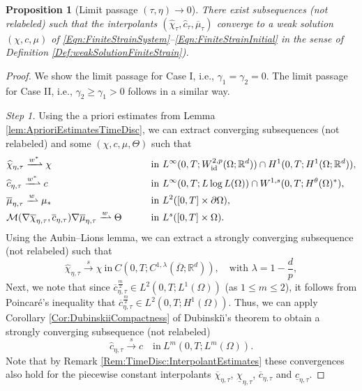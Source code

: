 \documentclass[a4paper,12pt]{article}
\newcommand{\R}{\mathbb{R}}
\newcommand{\calM}{\mathcal{M}}
\newcommand{\pl}{\partial}
\newcommand{\ubar}{\underline}
\newcommand{\id}{\mathrm{id}}
\newcommand{\chibar}{\overline{\chi}}
\newcommand{\chihat}{\widehat{\chi}}
\newcommand{\mubar}{\overline{\mu}}
\newcommand{\cbar}{\overline{c}}
\newcommand{\chat}{\widehat{c}}
\newcommand{\wto}{\xrightharpoonup{w}}
\newcommand{\wstarto}{\xrightharpoonup{w^*}}
\newcommand{\sto}{\xrightarrow{s}}
\theoremstyle{plain}
\newtheorem{Prop}[Th]{Proposition}
\theoremstyle{definition}
\numberwithin{equation}{section}
\begin{document}
 
	\begin{Prop}[Limit passage $(\tau,\eta)\to 0$]
         \label{Prop:LimitTimeDisc}
		There exist subsequences (not relabeled) such that the interpolants  $(\chihat_\tau, \chat_\tau, \mubar_\tau)$ converge to a weak solution $(\chi, c, \mu)$ of \eqref{Eqn:FiniteStrainSystem}--\eqref{Eqn:FiniteStrainInitial} in the sense of Definition \ref{Def:weakSolutionFiniteStrain}).
%
	\end{Prop}	


\begin{proof}
We show the limit passage for Case I, i.e., $\gamma_1=\gamma_2=0$. The limit passage for Case II, i.e., $\gamma_2\geq \gamma_1>0$ follows in a similar way.


\emph{Step 1.}
Using the a priori estimates from Lemma \ref{lem:AprioriEstimatesTimeDisc}, 
we can extract converging subsequences (not relabeled) and some $(\chi,c,\mu,\Theta)$ such that
\begin{alignat*}{2}
			&\chihat_{\eta,\tau} \wstarto \chi\ &&\text{in}\ L^\infty(0,T;W^{2,p}_\id(\Omega;\R^d))\cap H^1(0,T;H^1(\Omega;\R^d)),\\
			&\chat_{\eta,\tau} \wstarto c&&\text{in}\ L^\infty(0,T;L\log L(\Omega))\cap W^{1,s}(0,T;H^\theta(\Omega)^*),\\
			&\mubar_{\eta,\tau} \wto \mu_*&&\text{in}\ L^2([0,T]\times \pl\Omega),\\
            &\calM(\nabla\chibar_{\eta,\tau}, \cbar_{\eta,\tau})\nabla\mubar_{\eta,\tau} \wto \Theta\qquad&&\text{in}\ L^s([0,T]\times \Omega).
		\end{alignat*}
		Using the Aubin--Lions lemma, we can extract a strongly converging subsequence (not relabeled) such that
\[
\chihat_{\eta,\tau} \sto \chi\ \text{in}\ C(0,T;C^{1,\lambda}(\overline\Omega;\R^d)),\quad\text{with }\lambda=1-\frac{d}{p},
\]
Next, we note that since $\cbar_{\eta,\tau}^{\frac{m}{2}}\in L^2(0,T;L^1(\Omega))$ (as $1\leq m\leq 2$), it follows from Poincar\'e's inequality that $\cbar_{\eta,\tau}^{\frac{m}{2}}\in L^2(0,T;H^1(\Omega))$. Thus, we can apply Corollary \ref{Cor:DubinskiiCompactness} of Dubinski\u\i's theorem %
to obtain a strongly converging subsequence (not relabeled)
\[
\chat_{\eta,\tau} \sto c \quad \text{in}\ L^{m}(0,T;L^m(\Omega)).
\]
Note that by Remark 
\ref{Rem:TimeDisc:InterpolantEstimates} these convergences also hold for the piecewise 
constant interpolants $\chibar_{\eta,\tau}$, $\ubar\chi_{\eta,\tau}$, $\cbar_{\eta,\tau}$ and $\ubar c_{\eta,\tau}$.



\end{proof}
\end{document}
